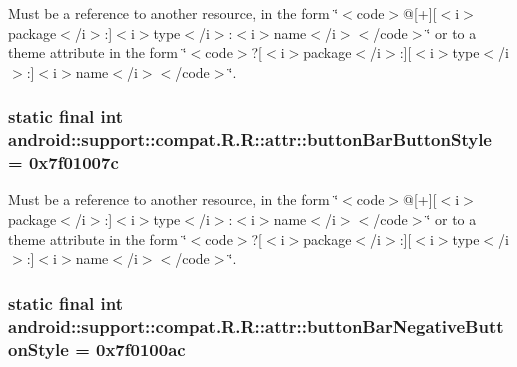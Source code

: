 Must be a reference to another resource, in the form \char`\"{}$<$code$>$@\mbox{[}+\mbox{]}\mbox{[}$<$i$>$package$<$/i$>$:\mbox{]}$<$i$>$type$<$/i$>$:$<$i$>$name$<$/i$>$$<$/code$>$\char`\"{} or to a theme attribute in the form \char`\"{}$<$code$>$?\mbox{[}$<$i$>$package$<$/i$>$:\mbox{]}\mbox{[}$<$i$>$type$<$/i$>$:\mbox{]}$<$i$>$name$<$/i$>$$<$/code$>$\char`\"{}. \hypertarget{classandroid_1_1support_1_1compat_1_1_r_1_1attr_cb48869935890b35b4d35cab4d8de4c6}{
\subsubsection[{buttonBarButtonStyle}]{\setlength{\rightskip}{0pt plus 5cm}static final int android::support::compat.R.R::attr::buttonBarButtonStyle = 0x7f01007c}}
\label{classandroid_1_1support_1_1compat_1_1_r_1_1attr_cb48869935890b35b4d35cab4d8de4c6}


Must be a reference to another resource, in the form \char`\"{}$<$code$>$@\mbox{[}+\mbox{]}\mbox{[}$<$i$>$package$<$/i$>$:\mbox{]}$<$i$>$type$<$/i$>$:$<$i$>$name$<$/i$>$$<$/code$>$\char`\"{} or to a theme attribute in the form \char`\"{}$<$code$>$?\mbox{[}$<$i$>$package$<$/i$>$:\mbox{]}\mbox{[}$<$i$>$type$<$/i$>$:\mbox{]}$<$i$>$name$<$/i$>$$<$/code$>$\char`\"{}. \hypertarget{classandroid_1_1support_1_1compat_1_1_r_1_1attr_e0ae34c3529db1654893bfb546eada23}{
\subsubsection[{buttonBarNegativeButtonStyle}]{\setlength{\rightskip}{0pt plus 5cm}static final int android::support::compat.R.R::attr::buttonBarNegativeButtonStyle = 0x7f0100ac}}
\label{classandroid_1_1support_1_1compat_1_1_r_1_1attr_e0ae34c3529db1654893bfb546eada23}


